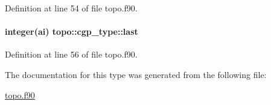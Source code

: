 Definition at line 54 of file topo.\-f90.

\hypertarget{structtopo_1_1cgp__type_a6564b85aef9ef0679cf1a78e7df26975}{
\paragraph[{last}]{\setlength{\rightskip}{0pt plus 5cm}integer(ai) topo\-::cgp\-\_\-type\-::last}}\label{structtopo_1_1cgp__type_a6564b85aef9ef0679cf1a78e7df26975}


Definition at line 56 of file topo.\-f90.



The documentation for this type was generated from the following file\-:\begin{DoxyCompactItemize}
\item 
\hyperlink{topo_8f90}{topo.\-f90}\end{DoxyCompactItemize}
